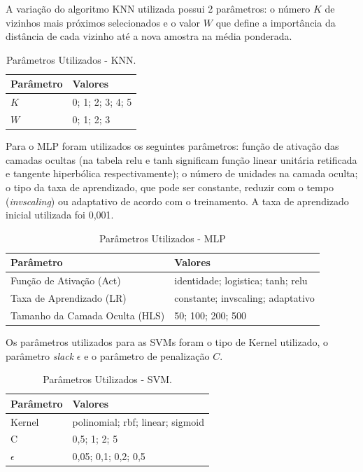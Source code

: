 \documentclass[12pt]{article}
\begin{document}
        A variação do algoritmo KNN utilizada possui 2 parâmetros: o número $K$ de vizinhos mais próximos selecionados e o valor $W$ que define a importância da distância de cada vizinho até a nova amostra na média ponderada.
        
        \begin{table}[htb]
        \centering
        \caption{Parâmetros Utilizados - KNN.}
        \label{table:parametersKNN}
        \begin{tabular}{ | l | p{5cm} |}
        \hline
        \textbf{Parâmetro} & \textbf{Valores} \\ \hline
        $K$ & 0; 1; 2; 3; 4; 5 \\ \hline
        $W$ & 0; 1; 2; 3 \\ \hline
        \end{tabular}
        \end{table}
        
        Para o MLP foram utilizados os seguintes parâmetros: função de ativação das camadas ocultas (na tabela relu e tanh significam função linear unitária retificada e tangente hiperbólica respectivamente); o número de unidades na camada oculta; o tipo da taxa de aprendizado, que pode ser constante, reduzir com o tempo (\textit{invscaling}) ou adaptativo de acordo com o treinamento. A taxa de aprendizado inicial utilizada foi 0,001.
        
        \begin{table}[htb]
        \centering
        \caption{Parâmetros Utilizados - MLP}
        \label{table:parametersMLP}
        \begin{tabular}{ | l | p{7cm} |} \hline
        \textbf{Parâmetro} & \textbf{Valores} \\ \hline
        Função de Ativação (Act) & identidade; logistica; tanh; relu \\ \hline
        Taxa de Aprendizado (LR) & constante; invscaling; adaptativo \\ \hline
        Tamanho da Camada Oculta (HLS) & 50; 100; 200; 500 \\ \hline
        \end{tabular}
        \end{table}
        
        Os parâmetros utilizados para as SVMs foram o tipo de Kernel utilizado, o parâmetro \textit{slack} $\epsilon$ e o parâmetro de penalização $C$. 
        
        \begin{table}[htb]
        \centering
        \caption{Parâmetros Utilizados - SVM.}
        \label{table:parametersSVM}
        \begin{tabular}{ | l | p{7cm} |} \hline
        \textbf{Parâmetro} & \textbf{Valores} \\ \hline
        Kernel & polinomial; rbf; linear; sigmoid \\ \hline
        C & 0,5; 1; 2; 5 \\ \hline
        $\epsilon$ & 0,05; 0,1; 0,2; 0,5 \\ \hline
        \end{tabular}
        \end{table}
        
\end{document}
